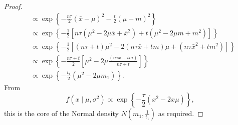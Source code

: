 \documentclass[10pt, a4paper]{article}
\begin{document}
\begin{theorem}
\begin{proof}
\begin{align*}
            &\propto \exp\left\{-\frac{n\tau}{2}(\bar{x} - \mu) ^ 2 -\frac{t}{2}(\mu - m) ^ 2\right\} \\
            &\propto \exp\left\{-\frac{1}{2}[n\tau(\mu ^ 2 - 2\mu\bar{x} + \bar{x} ^ 2) + t(\mu ^ 2 - 2\mu m + m ^ 2)]\right\} \\
            &\propto \exp\left\{-\frac{1}{2}[(n\tau + t)\mu ^ 2 - 2(n\tau\bar{x} + tm)\mu + (n\tau\bar{x} ^ 2 + tm ^ 2)]\right\} \\
            &\propto \exp\left\{-\frac{n\tau + t}{2}\left[\mu ^ 2 - 2\mu\frac{(n\tau\bar{x} + tm)}{n\tau + t}\right]\right\} \\
            &\propto \exp\left\{-\frac{t_1}{2}(\mu ^ 2 - 2\mu m_1)\right\}.
        \end{align*}
        From
        \[
        f(x\mid\mu, \sigma ^ 2) \propto \exp\left\{-\frac{\tau}{2}(x ^ 2 - 2x\mu)\right\},
        \]
        this is the core of the Normal density $N\left(m_1, \frac{1}{t_1}\right)$ as required.
    \end{proof}
\end{theorem}
\end{document}
